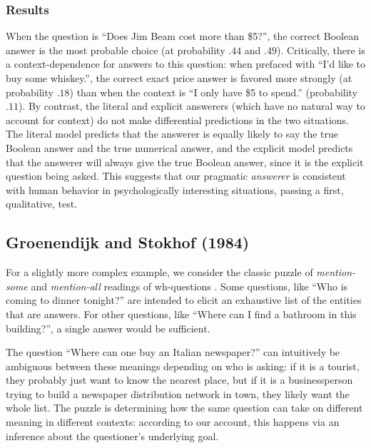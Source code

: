 \documentclass[12pt, floatsintext, jou]{apa6}
\begin{document}
\subsubsection{Results} 
When the question is ``Does Jim Beam cost more than \$5?'', the correct Boolean answer is  the most probable choice (at probability $.44$ and $.49$). Critically, there is a context-dependence for answers to this question: when prefaced with ``I'd like to buy some whiskey.'', the correct exact price answer is favored more strongly (at probability $.18$) than when the context is ``I only have \$5 to spend.'' (probability $.11$). By contrast, the literal and explicit answerers (which have no natural way to account for context) do not make differential predictions in the two situations. The literal model predicts that the answerer is equally likely to say the true Boolean answer and the true numerical answer, and the explicit model predicts that the answerer will always give the true Boolean answer, since it is the explicit question being asked. This suggests that our pragmatic \emph{answerer} is consistent with human behavior in psychologically interesting situations, passing a first, qualitative, test. 

\subsection{Groenendijk and Stokhof (1984)}

For a slightly more complex example, we consider the classic puzzle of \emph{mention-some} and \emph{mention-all} readings of wh-questions  \cite{GroenendijkStokhof84_SemanticsOfQuestions,SchulzVanRooij06_ExhaustiveInterpretation}. Some questions, like ``Who is coming to dinner tonight?'' are intended to elicit an exhaustive list of the entities that are answers. For other questions, like ``Where can I find a bathroom in this building?'', a single answer would be sufficient. 

The question ``Where can one buy an Italian newspaper?'' can intuitively be ambiguous between these meanings depending on who is asking: if it is a tourist, they probably just want to know the nearest place, but if it is a businessperson trying to build a newspaper distribution network in town, they likely want the whole list. The puzzle is determining how the same question can take on different meaning in different contexts: according to our account, this happens via an inference about the questioner's underlying goal.
\end{document}
